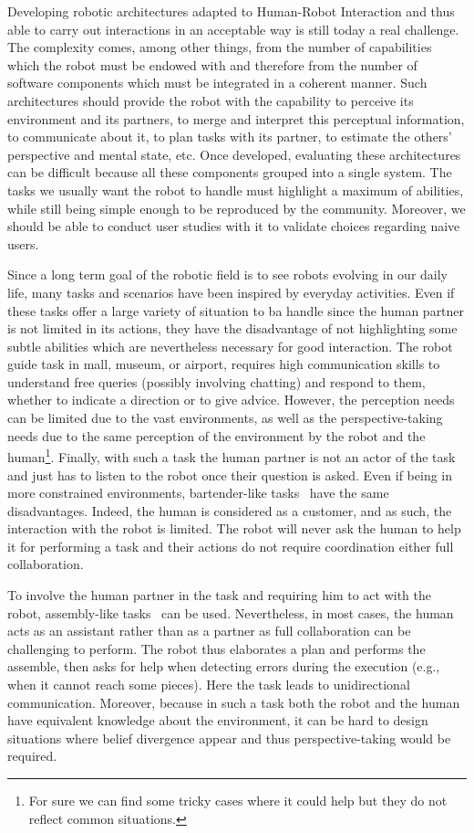 Developing robotic architectures adapted to Human-Robot Interaction and thus able to carry out interactions in an acceptable way is still today a real challenge. The complexity comes, among other things, from the number of capabilities which the robot must be endowed with and therefore from the number of software components which must be integrated in a coherent manner. Such architectures should provide the robot with the capability to perceive its environment and its partners, to merge and interpret this perceptual information, to communicate about it, to plan tasks with its partner, to estimate the others' perspective and mental state, etc. Once developed, evaluating these architectures can be difficult because all these components grouped into a single system. The tasks we usually want the robot to handle must highlight a maximum of abilities, while still being simple enough to be reproduced by the community. Moreover, we should be able to conduct user studies with it to validate choices regarding naive users.

Since a long term goal of the robotic field is to see robots evolving in our daily life, many tasks and scenarios have been inspired by everyday activities. Even if these tasks offer a large variety of situation to ba handle since the human partner is not limited in its actions, they have the disadvantage of not highlighting some subtle abilities which are nevertheless necessary for good interaction.
The robot guide task \cite{satake_2015_should} in mall, museum, or airport, requires high communication skills to understand free queries (possibly involving chatting) and respond to them, whether to indicate a direction or to give advice. However, the perception needs can be limited due to the vast environments, as well as the perspective-taking needs due to the same perception of the environment by the robot and the human\footnote{For sure we can find some tricky cases where it could help but they do not reflect common situations.}. Finally, with such a task the human partner is not an actor of the task and just has to listen to the robot once their question is asked. Even if being in more constrained environments, bartender-like tasks~\cite{petrick_2012_social} have the same disadvantages. Indeed, the human is considered as a customer, and as such, the interaction with the robot is limited. The robot will never ask the human to help it for performing a task and their actions do not require coordination either full collaboration.

To involve the human partner in the task and requiring him to act with the robot, assembly-like tasks~\cite{tellex_2014_asking} can be used. Nevertheless, in most cases, the human acts as an assistant rather than as a partner as full collaboration can be challenging to perform. The robot thus elaborates a plan and performs the assemble, then asks for help when detecting errors during the execution (e.g., when it cannot reach some pieces). Here the task leads to unidirectional communication. Moreover, because in such a task both the robot and the human have equivalent knowledge about the environment, it can be hard to design situations where belief divergence appear and thus perspective-taking would be required.

